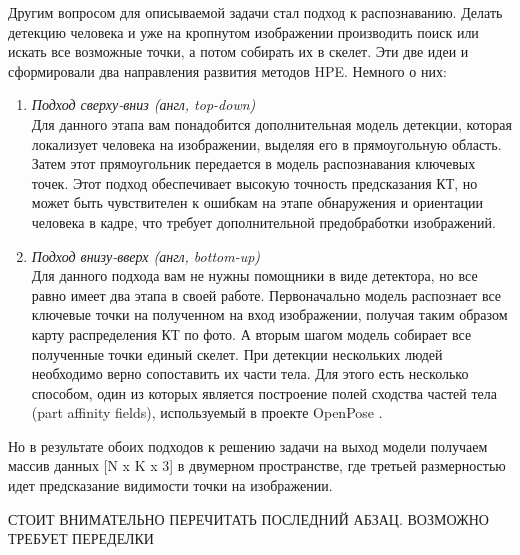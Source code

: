 \hfill \break

Другим вопросом для описываемой задачи стал подход к распознаванию. Делать детекцию человека и уже на кропнутом изображении производить поиск или искать все возможные точки, а потом собирать их в скелет. Эти две идеи и сформировали два направления развития методов HPE. Немного о них:
\begin{enumerate}
	\item \textit{Подход сверху-вниз (англ, top-down)}\\
	Для данного этапа вам понадобится дополнительная модель детекции, которая локализует человека на изображении, выделяя его в прямоугольную область. Затем этот прямоугольник передается в модель распознавания ключевых точек. Этот подход обеспечивает высокую точность предсказания КТ, но может быть чувствителен к ошибкам на этапе обнаружения и ориентации человека в кадре, что требует дополнительной предобработки изображений.
	\item \textit{Подход внизу-вверх (англ, bottom-up)}\\
	Для данного подхода вам не нужны помощники в виде детектора, но все равно имеет два этапа в своей работе. Первоначально модель распознает все ключевые точки на полученном на вход изображении, получая таким образом карту распределения КТ по фото. А вторым шагом модель собирает все полученные точки единый скелет. При детекции нескольких людей необходимо верно сопоставить их части тела. Для этого есть несколько способом, один из которых является построение полей сходства частей тела (part affinity fields), используемый в проекте OpenPose \cite{OpenPose}.
\end{enumerate}

Но в результате обоих подходов к решению задачи на выход модели получаем массив данных [N x K x 3] в двумерном пространстве, где третьей размерностью идет предсказание видимости точки на изображении.

СТОИТ ВНИМАТЕЛЬНО ПЕРЕЧИТАТЬ ПОСЛЕДНИЙ АБЗАЦ. ВОЗМОЖНО ТРЕБУЕТ ПЕРЕДЕЛКИ

\newpage